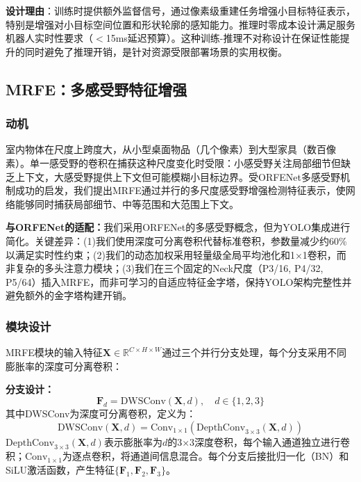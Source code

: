 \documentclass[journal]{IEEEtran}
\begin{document}
\textbf{设计理由}：训练时提供额外监督信号，通过像素级重建任务增强小目标特征表示，特别是增强对小目标空间位置和形状轮廓的感知能力。推理时零成本设计满足服务机器人实时性要求（$<$15ms延迟预算）。这种训练-推理不对称设计在保证性能提升的同时避免了推理开销，是针对资源受限部署场景的实用权衡。


\subsection{MRFE：多感受野特征增强}
\label{subsec:mrfe}

\subsubsection{动机}

室内物体在尺度上跨度大，从小型桌面物品（几个像素）到大型家具（数百像素）。单一感受野的卷积在捕获这种尺度变化时受限：小感受野关注局部细节但缺乏上下文，大感受野提供上下文但可能模糊小目标边界。受ORFENet多感受野机制成功的启发，我们提出MRFE通过并行的多尺度感受野增强检测特征表示，使网络能够同时捕获局部细节、中等范围和大范围上下文。

\textbf{与ORFENet的适配：}我们采用ORFENet的多感受野概念，但为YOLO集成进行简化。关键差异：(1)我们使用深度可分离卷积代替标准卷积，参数量减少约60\%以满足实时性约束；(2)我们的动态加权采用轻量级全局平均池化和1$\times$1卷积，而非复杂的多头注意力模块；(3)我们在三个固定的Neck尺度（P3/16, P4/32, P5/64）插入MRFE，而非可学习的自适应特征金字塔，保持YOLO架构完整性并避免额外的金字塔构建开销。

\subsubsection{模块设计}

MRFE模块的输入特征$\mathbf{X} \in \mathbb{R}^{C \times H \times W}$通过三个并行分支处理，每个分支采用不同膨胀率的深度可分离卷积：

\textbf{分支设计：}
\begin{equation}
\mathbf{F}_d = \text{DWSConv}(\mathbf{X}, d), \quad d \in \{1, 2, 3\}
\end{equation}
其中DWSConv为深度可分离卷积，定义为：
\begin{equation}
\text{DWSConv}(\mathbf{X}, d) = \text{Conv}_{1\times1}(\text{DepthConv}_{3\times3}(\mathbf{X}, d))
\end{equation}
$\text{DepthConv}_{3\times3}(\mathbf{X}, d)$表示膨胀率为$d$的3$\times$3深度卷积，每个输入通道独立进行卷积；$\text{Conv}_{1\times1}$为逐点卷积，将通道间信息混合。每个分支后接批归一化（BN）和SiLU激活函数，产生特征$\{\mathbf{F}_1, \mathbf{F}_2, \mathbf{F}_3\}$。
\end{document}
